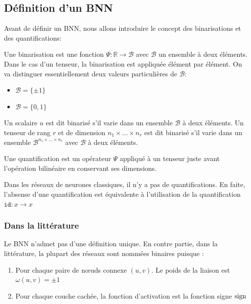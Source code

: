 \subsection{Définition d'un BNN}
Avant de définir un BNN, nous allons introduire le concept des binarisations et des quantifications:
\begin{definition}
	Une binarisation est une fonction $\Psi:\mathbb{R}\rightarrow \mathcal{B}$ avec $\mathcal{B}$ un ensemble à deux éléments.
	\newline Dans le cas d'un tenseur, la binarisation est appliquée élément par élément.
	\newline On va distinguer essentiellement deux valeurs particulières de $\mathcal{B}:$
	\begin{itemize}
		\item $\mathcal{B}=\{\pm 1\}$
		\item $\mathcal{B}=\{0,1\}$
	\end{itemize}
\end{definition}
\begin{definition}
	Un scalaire $u$ est dit binarisé s'il varie dans un ensemble $\mathcal{B}$ à deux éléments.
	\newline Un tenseur de rang $r$ et de dimension $n_1\times\dots\times n_r$ est dit binarisé s'il varie dans un ensemble $\mathcal{B}^{n_1\times\dots\times n_r}$ avec $\mathcal{B}$ à deux éléments.
\end{definition}
\begin{definition}
	Une quantification est un opérateur $\Psi$ appliqué à un tenseur juste avant l'opération bilinéaire en conservant ses dimensions.
\end{definition}
\begin{remark}
	Dans les réseaux de neurones classiques, il n'y a pas de quantifications. En faite, l'absense d'une quantification est équivalente à l'utilisation de la quantification $\mathtt{id}:x\rightarrow x$
\end{remark}

\subsubsection{Dans la littérature}
Le BNN n'admet pas d'une définition unique. En contre partie, dans la littérature\cite{BNNDefinition}, la plupart des réseaux sont nommées binaires puisque :
\begin{enumerate}
	\item Pour chaque paire de nœuds connexe $(u,v).$ Le poids de la liaison est $\omega(u,v)=\pm 1$
	\item Pour chaque couche cachée, la fonction d'activation est la fonction signe $\operatorname{sign}$
\end{enumerate}
